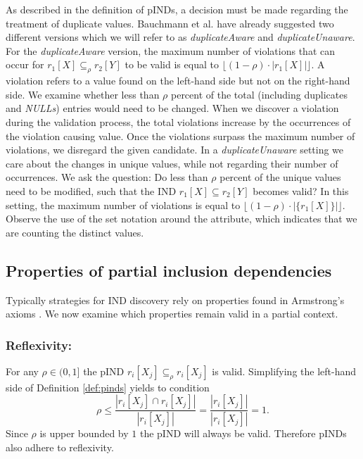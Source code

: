 As described in the definition of pINDs, a decision must be made regarding the treatment of duplicate values. Bauchmann et al. have already suggested two different versions \cite{bauckmann2006efficiently} which we will refer to as \textit{duplicateAware} and \textit{duplicateUnaware}.
For the \textit{duplicateAware} version, the maximum number of violations that can occur for $r_1[X] \subseteq_{\rho} r_2[Y]$ to be valid is equal to $\lfloor (1-\rho) \cdot |r_1[X]| \rfloor$. A violation refers to a value found on the left-hand side but not on the right-hand side. We examine whether less than $\rho$ percent of the total (including duplicates and \textit{NULLs}) entries would need to be changed. When we discover a violation during the validation process, the total violations increase by the occurrences of the violation causing value. Once the violations surpass the maximum number of violations, we disregard the given candidate. In a \textit{duplicateUnaware} setting we care about the changes in unique values, while not regarding their number of occurrences. We ask the question: Do less than $\rho$ percent of the unique values need to be modified, such that the IND $r_1[X] \subseteq r_2[Y]$ becomes valid? In this setting, the maximum number of violations is equal to $\lfloor(1-\rho) \cdot |\{r_1[X]\}| \rfloor$. Observe the use of the set notation around the attribute, which indicates that we are counting the distinct values. \\

\subsection{Properties of partial inclusion dependencies}\label{subsec:pIND_props}
Typically strategies for IND discovery rely on properties found in Armstrong's axioms \cite{armstrong2002armstrong}. We now examine which properties remain valid in a partial context. 

\subsubsection{\textbf{Reflexivity:}}
For any $\rho \in (0, 1]$ the pIND $r_i[X_j] \subseteq_{\rho} r_i[X_j]$ is valid. Simplifying the left-hand side of Definition \ref{def:pinds} yields to condition
$$
    \rho \leq \frac{|r_i[X_j] \cap r_i[X_j]|}
        {|r_i[X_j]|} = \frac{|r_i[X_j]|}
        {|r_i[X_j]|} = 1.
$$
Since $\rho$ is upper bounded by $1$ the pIND will always be valid. Therefore pINDs also adhere to reflexivity.

